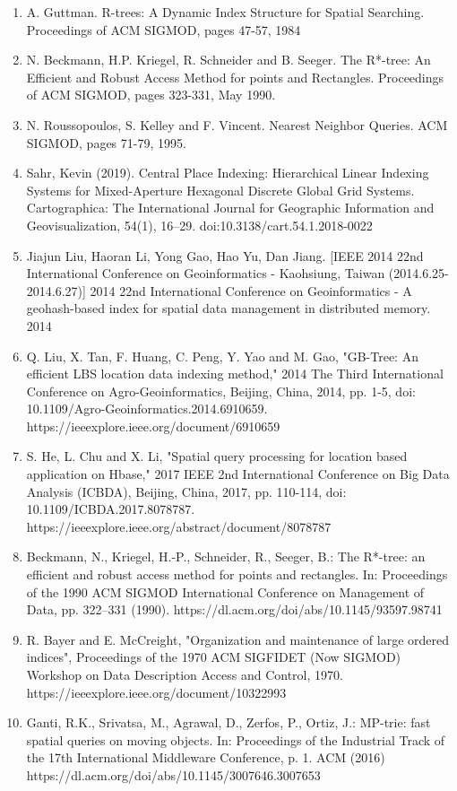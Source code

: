 %




\begin{enumerate}[1)]
    \item A. Guttman. R-trees: A Dynamic Index Structure for Spatial Searching. Proceedings of ACM SIGMOD, pages 47-57, 1984
    \item N. Beckmann, H.P. Kriegel, R. Schneider and B. Seeger. The R*-tree: An Efficient and Robust Access Method for points and Rectangles. Proceedings of ACM SIGMOD, pages 323-331, May 1990.
    \item N. Roussopoulos, S. Kelley and F. Vincent. Nearest Neighbor Queries. ACM SIGMOD, pages 71-79, 1995.
    \item Sahr, Kevin (2019). Central Place Indexing: Hierarchical Linear Indexing Systems for Mixed-Aperture Hexagonal Discrete Global Grid Systems. Cartographica: The International Journal for Geographic Information and Geovisualization, 54(1), 16–29. doi:10.3138/cart.54.1.2018-0022
    \item  Jiajun Liu, Haoran Li, Yong Gao, Hao Yu, Dan Jiang. [IEEE 2014 22nd International Conference on Geoinformatics - Kaohsiung, Taiwan (2014.6.25-2014.6.27)] 2014 22nd International Conference on Geoinformatics - A geohash-based index for spatial data management in distributed memory. 2014
    \item Q. Liu, X. Tan, F. Huang, C. Peng, Y. Yao and M. Gao, "GB-Tree: An efficient LBS location data indexing method," 2014 The Third International Conference on Agro-Geoinformatics, Beijing, China, 2014, pp. 1-5, doi: 10.1109/Agro-Geoinformatics.2014.6910659. https://ieeexplore.ieee.org/document/6910659
    \item S. He, L. Chu and X. Li, "Spatial query processing for location based application on Hbase," 2017 IEEE 2nd International Conference on Big Data Analysis (ICBDA), Beijing, China, 2017, pp. 110-114, doi: 10.1109/ICBDA.2017.8078787. https://ieeexplore.ieee.org/abstract/document/8078787
    \item  Beckmann, N., Kriegel, H.-P., Schneider, R., Seeger, B.: The R*-tree: an efficient and robust access method for points and rectangles. In: Proceedings of the 1990 ACM SIGMOD International Conference on Management of Data, pp. 322–331 (1990). https://dl.acm.org/doi/abs/10.1145/93597.98741
    \item R. Bayer and E. McCreight, "Organization and maintenance of large ordered indices", Proceedings of the 1970 ACM SIGFIDET (Now SIGMOD) Workshop on Data Description Access and Control, 1970. https://ieeexplore.ieee.org/document/10322993
    \item Ganti, R.K., Srivatsa, M., Agrawal, D., Zerfos, P., Ortiz, J.: MP-trie: fast spatial queries on moving objects. In: Proceedings of the Industrial Track of the 17th International Middleware Conference, p. 1. ACM (2016) https://dl.acm.org/doi/abs/10.1145/3007646.3007653
\end{enumerate}


